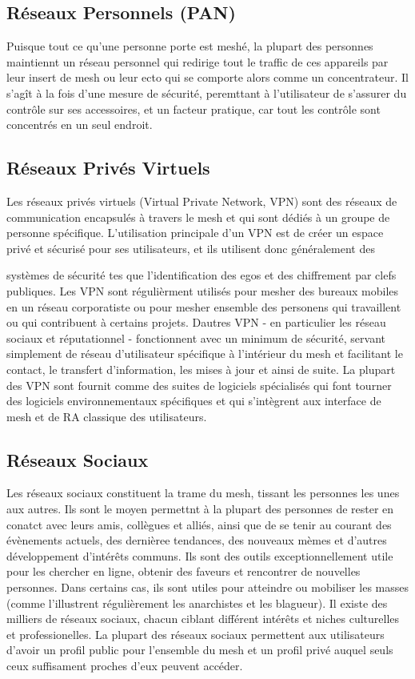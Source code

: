 \subsection{Réseaux Personnels (PAN)} 

Puisque tout ce qu'une personne porte est meshé, la plupart des personnes maintiennt un réseau personnel qui redirige tout le traffic de ces appareils par leur insert de mesh ou leur ecto qui se comporte alors comme un concentrateur. Il s'agît à la fois d'une mesure de sécurité, peremttant à l'utilisateur de s'assurer du contrôle sur ses accessoires, et un facteur pratique, car tout les contrôle sont concentrés en un seul endroit. 

\subsection{Réseaux Privés Virtuels} 

Les réseaux privés virtuels (Virtual Private Network, VPN) sont des réseaux de communication encapsulés à travers le mesh et qui sont dédiés à un groupe de personne spécifique. L'utilisation principale d'un VPN est de créer un espace privé et sécurisé pour ses utilisateurs, et ils utilisent donc généralement des 

systèmes de sécurité tes que l'identification des egos et des chiffrement par clefs publiques. Les VPN sont régulièrment utilisés pour mesher des bureaux mobiles en un réseau corporatiste ou pour mesher ensemble des personens qui travaillent ou qui contribuent à certains projets. Dautres VPN - en particulier les réseau sociaux et réputationnel - fonctionnent avec un minimum de sécurité, servant simplement de réseau d'utilisateur spécifique à l'intérieur du mesh et facilitant le contact, le transfert d'information, les mises à jour et ainsi de suite. La plupart des VPN sont fournit comme des suites de logiciels spécialisés qui font tourner des logiciels environnementaux spécifiques et qui s'intègrent aux interface de mesh et de RA classique des utilisateurs. 

\subsection{Réseaux Sociaux} 

Les réseaux sociaux constituent la trame du mesh, tissant les personnes les unes aux autres. Ils sont le moyen permettnt à la plupart des personnes de rester en conatct avec leurs amis, collègues et alliés, ainsi que de se tenir au courant des évènements actuels, des dernièree tendances, des nouveaux mèmes et d'autres développement d'intérêts communs. Ils sont des outils exceptionnellement utile pour les chercher en ligne, obtenir des faveurs et rencontrer de nouvelles personnes. Dans certains cas, ils sont utiles pour atteindre ou mobiliser les masses (comme l'illustrent régulièrement les anarchistes et les blagueur). Il existe des milliers de réseaux sociaux, chacun ciblant différent intérêts et niches culturelles et professionelles. La plupart des réseaux sociaux permettent aux utilisateurs d'avoir un profil public pour l'ensemble du mesh et un profil privé auquel seuls ceux suffisament proches d'eux peuvent accéder. 

